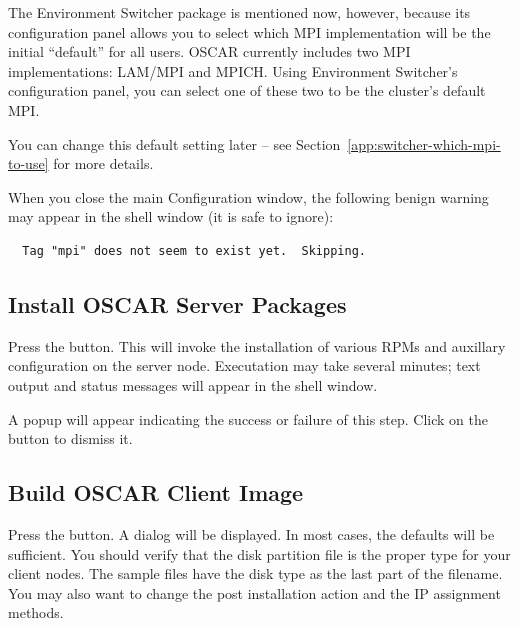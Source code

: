 The Environment Switcher package is mentioned now, however, because
its configuration panel allows you to select which MPI implementation
will be the initial ``default'' for all users.  OSCAR currently
includes two MPI implementations: LAM/MPI and MPICH.  Using
Environment Switcher's configuration panel, you can select one of
these two to be the cluster's default MPI.  

You can change this default setting later -- see
Section~\ref{app:switcher-which-mpi-to-use} for more details.

When you close the main Configuration window, the following benign
warning may appear in the shell window (it is safe to ignore):

\begin{verbatim}
  Tag "mpi" does not seem to exist yet.  Skipping.
\end{verbatim}


\subsection{Install OSCAR Server Packages}
\label{det:install-server-packages}

Press the  button.  This will
invoke the installation of various RPMs and auxillary configuration on
the server node.  Executation may take several minutes; text output
and status messages will appear in the shell window.

A popup will appear indicating the success or failure of this step.
Click on the  button to dismiss it.


\subsection{Build OSCAR Client Image}
\label{det:build-client-image}

Press the  button. A dialog will be
displayed. In most cases, the defaults will be sufficient. You should
verify that the disk partition file is the proper type for your client
nodes. The sample files have the disk type as the last part of the
filename. You may also want to change the post installation action and
the IP assignment methods.  

